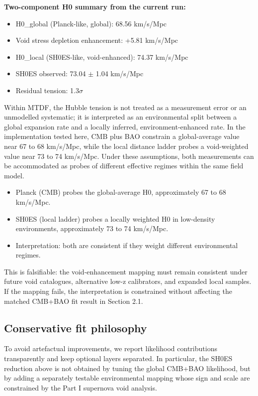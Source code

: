 \documentclass[11pt,a4paper]{article}
\begin{document}
\textbf{Two-component H0 summary from the current run:}

\begin{itemize}
  \item H0\_\allowbreak{}global (Planck-like, global): 68.56 km/\allowbreak{}s/\allowbreak{}Mpc
  \item Void stress depletion enhancement: +5.81 km/\allowbreak{}s/\allowbreak{}Mpc
  \item H0\_\allowbreak{}local (SH0ES-like, void-enhanced): 74.37 km/\allowbreak{}s/\allowbreak{}Mpc
  \item SH0ES observed: 73.04 $\pm$ 1.04 km/\allowbreak{}s/\allowbreak{}Mpc
  \item Residual tension: 1.3$\sigma$
\end{itemize}

Within MTDF, the Hubble tension is not treated as a measurement error or an unmodelled systematic; it is interpreted as an environmental split between a global expansion rate and a locally inferred, environment-enhanced rate. In the implementation tested here, CMB plus BAO constrain a global-average value near 67 to 68 km/\allowbreak{}s/\allowbreak{}Mpc, while the local distance ladder probes a void-weighted value near 73 to 74 km/\allowbreak{}s/\allowbreak{}Mpc. Under these assumptions, both measurements can be accommodated as probes of different effective regimes within the same field model.

\begin{itemize}
  \item Planck (CMB) probes the global-average H0, approximately 67 to 68 km/\allowbreak{}s/\allowbreak{}Mpc.
  \item SH0ES (local ladder) probes a locally weighted H0 in low-density environments, approximately 73 to 74 km/\allowbreak{}s/\allowbreak{}Mpc.
  \item Interpretation: both are consistent if they weight different environmental regimes.
\end{itemize}

This is falsifiable: the void-enhancement mapping must remain consistent under future void catalogues, alternative low-z calibrators, and expanded local samples. If the mapping fails, the interpretation is constrained without affecting the matched CMB+BAO fit result in Section 2.1.

\subsection{Conservative fit philosophy}
To avoid artefactual improvements, we report likelihood contributions transparently and keep optional layers separated. In particular, the SH0ES reduction above is not obtained by tuning the global CMB+BAO likelihood, but by adding a separately testable environmental mapping whose sign and scale are constrained by the Part I supernova void analysis.
\end{document}
